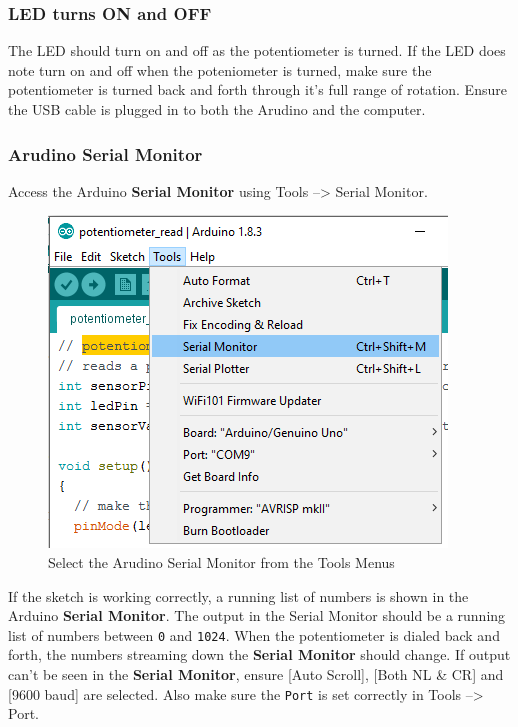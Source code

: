 \documentclass{book}
\makeatletter
\def\maxwidth{\ifdim\Gin@nat@width>\linewidth\linewidth
    \else\Gin@nat@width\fi}
\let\Oldincludegraphics\includegraphics
\renewcommand{\includegraphics}[1]{\Oldincludegraphics[width=.8\maxwidth]{#1}}
\makeatother
\begin{document}
    
        \subsubsection{LED turns ON and OFF}\label{led-turns-on-and-off}

The LED should turn on and off as the potentiometer is turned. If the
LED does note turn on and off when the poteniometer is turned, make sure
the potentiometer is turned back and forth through it's full range of
rotation. Ensure the USB cable is plugged in to both the Arudino and the
computer.
    




    
        \subsubsection{Arudino Serial Monitor}\label{arudino-serial-monitor}

Access the Arduino \textbf{Serial Monitor} using Tools --\textgreater{}
Serial Monitor.

\begin{figure}
\centering
\includegraphics{images/Tools_SerialMonitor.png}
\caption{Select the Arudino Serial Monitor from the Tools Menus}
\end{figure}
    




    
        If the sketch is working correctly, a running list of numbers is shown
in the Arduino \textbf{Serial Monitor}. The output in the Serial Monitor
should be a running list of numbers between \lstinline!0! and
\lstinline!1024!. When the potentiometer is dialed back and forth, the
numbers streaming down the \textbf{Serial Monitor} should change. If
output can't be seen in the \textbf{Serial Monitor}, ensure {[}Auto
Scroll{]}, {[}Both NL \& CR{]} and {[}9600 baud{]} are selected. Also
make sure the \lstinline!Port! is set correctly in Tools
--\textgreater{} Port.
\end{document}
